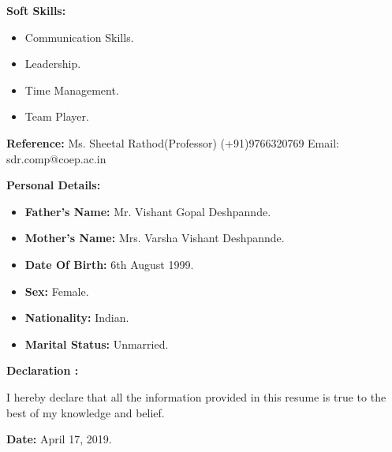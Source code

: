 \documentclass[a4paper,11pt]{article}
\begin{document}
\begin{minipage}[t]{0.4\textwidth}
	\raggedright\smallskip
		\begin{LARGE}
    		\textbf{Soft Skills:}\medskip%
				{\small
					\begin{itemize}
						\item {Communication Skills.}
						\item {Leadership.}
						\item {Time Management.}
						\item {Team Player.}
					\end{itemize}
				}
				\begin{Large}
					\vspace{0.4cm}
					\textbf{Reference:}\medskip\linebreak%
					{\small Ms. Sheetal Rathod(Professor) \linebreak%
					(+91)9766320769\linebreak%
					Email: sdr.comp@coep.ac.in
				}
				\end{Large}
			\end{LARGE}
			\vspace{0.5cm}	

\end{minipage}%
\hspace{0.6cm}
\begin{minipage}[t]{0.6\textwidth}
			\raggedright\smallskip
			\begin{LARGE}
				\textbf{Personal Details:}\medskip%
				{\small
					\begin{itemize}
						\item \textbf{Father's Name:} Mr. Vishant Gopal Deshpannde.
						\item \textbf{Mother's Name:} Mrs. Varsha Vishant Deshpannde.
						\item \textbf{Date Of Birth:} 6th August 1999.
						\item \textbf{Sex:} Female.
						\item \textbf{Nationality:} Indian.
						\item \textbf{Marital Status:} Unmarried.
					\end{itemize}
				}
			\end{LARGE}
			\vspace{0.65cm}

\end{minipage}%

\vspace{0.3cm}


	\begin{Large}
		\textbf{Declaration :}
	\end{Large}

	\begin{large}
	I hereby declare that all the information provided in this resume is true to the best of my knowledge and belief.\\
	\end{large}

\vspace{0.3cm}
\begin{Large}
	\textbf{Date:} \large April 17, 2019.
\end{Large}
\end{document}
